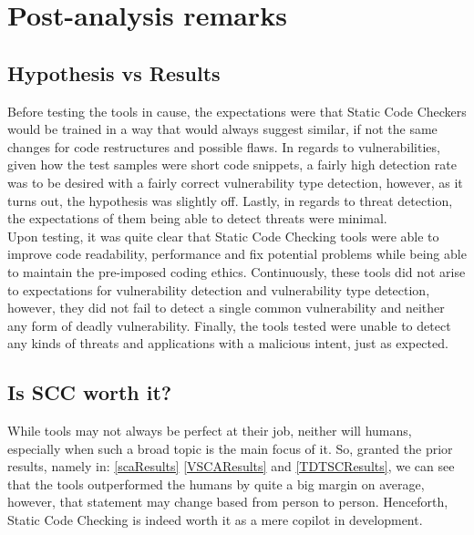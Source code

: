 
\chapter{Post-analysis remarks}\label{cap:remarks}


\section{Hypothesis vs Results}

Before testing the tools in cause, the expectations were that Static Code Checkers would be trained in a way that would always suggest similar, if not the same changes for code restructures and possible flaws. In regards to vulnerabilities, given how the test samples were short code snippets, a fairly high detection rate was to be desired with a fairly correct vulnerability type detection, however, as it turns out, the hypothesis was slightly off. Lastly, in regards to threat detection, the expectations of them being able to detect threats were minimal.\\

\noindent Upon testing, it was quite clear that Static Code Checking tools were able to improve code readability, performance and fix potential problems while being able to maintain the pre-imposed coding ethics. Continuously, these tools did not arise to expectations for vulnerability detection and vulnerability type detection, however, they did not fail to detect a single common vulnerability and neither any form of deadly vulnerability. Finally, the tools tested were unable to detect any kinds of threats and applications with a malicious intent, just as expected.


\section{Is SCC worth it?}

While tools may not always be perfect at their job, neither will humans, especially when such a broad topic is the main focus of it. So, granted the prior results, namely in:  \ref{scaResults} \ref{VSCAResults} and \ref{TDTSCResults}, we can see that the tools outperformed the humans by quite a big margin on average, however, that statement may change based from person to person. Henceforth, Static Code Checking is indeed worth it as a mere copilot in development.


